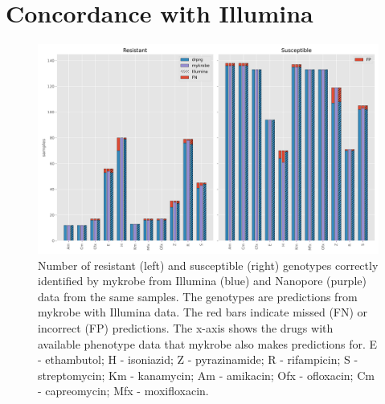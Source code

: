 \section{Concordance with Illumina}

\begin{figure}
\begin{center}
\includegraphics[width=0.90\columnwidth]{Chapter3/Figs/illumina_concordance.png}
\caption{{Number of resistant (left) and susceptible (right) genotypes correctly identified by mykrobe from Illumina (blue) and Nanopore (purple) data from the same samples. The genotypes are predictions from mykrobe with Illumina data. The red bars indicate missed (FN) or incorrect (FP) predictions. The x-axis shows the drugs with available phenotype data that mykrobe also makes predictions for. E - ethambutol; H - isoniazid; Z - pyrazinamide; R - rifampicin; S - streptomycin; Km - kanamycin; Am - amikacin; Ofx - ofloxacin; Cm - capreomycin; Mfx - moxifloxacin.
{\label{fig:geno-concordance}}
}}
\end{center}
\end{figure}

